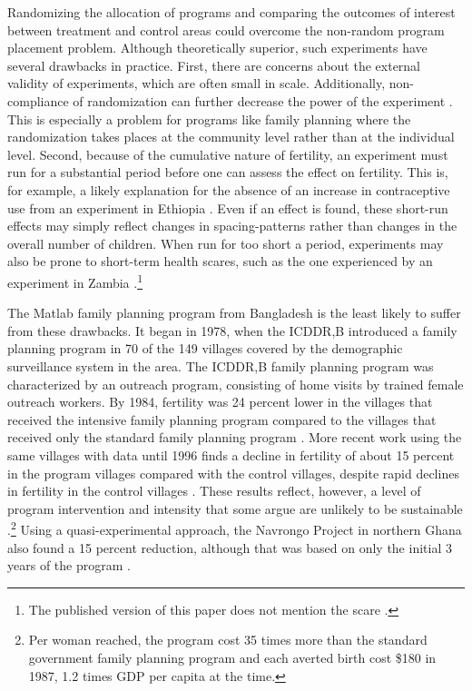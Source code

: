\documentclass[]{article}
\begin{document}
Randomizing the allocation of programs and comparing the outcomes of interest between treatment and control areas could overcome the non-random program placement problem. Although theoretically superior, such experiments have several drawbacks in practice. First, there are concerns about the external validity of experiments, which are often small in scale. Additionally, non-compliance of randomization can further decrease the power of the experiment \citep{Desai2011}. This is especially a problem for programs like family planning where the randomization takes places at the community level rather than at the individual level. Second, because of the cumulative nature of fertility, an experiment must run for a substantial period before one can assess the effect on fertility. This is, for example, a likely explanation for the absence of an increase in contraceptive use from an experiment in Ethiopia \citep{Desai2011}. Even if an effect is found, these short-run effects may simply reflect changes in spacing-patterns rather than changes in the overall number of children. When run for too short a period, experiments may also be prone to short-term health scares, such as the one experienced by an experiment in Zambia \citep{Ashraf2009}.\footnote{The published version of this paper does not mention the scare \citep{Ashraf2014}.}

The Matlab family planning program from Bangladesh is the least likely to suffer from these drawbacks. It began in 1978, when the ICDDR,B introduced a family planning program in 70 of the 149 villages covered by the demographic surveillance system in the area. The ICDDR,B family planning program was characterized by an outreach program, consisting of home visits by trained female outreach workers. By 1984, fertility was 24 percent lower in the villages that received the intensive family planning program compared to the villages that received only the standard family planning program \citep{Phillips1988}. More recent work using the same villages with data until 1996 finds a decline in fertility of about 15 percent in the program villages compared with the control villages, despite rapid declines in fertility in the control villages \citep{Sinha2005,Joshi2007}. These results reflect, however, a level of program intervention and intensity that some argue are unlikely to be sustainable \citep{pritchett94a}.\footnote{Per woman reached, the program cost 35 times more than the standard government family planning program and each averted birth cost \$180 in 1987, 1.2 times GDP per capita at the time.} Using a quasi-experimental approach, the Navrongo Project in northern Ghana also found a 15 percent reduction, although that was based on only the initial 3 years of the program \citep{Debpuur2002}.
\end{document}
